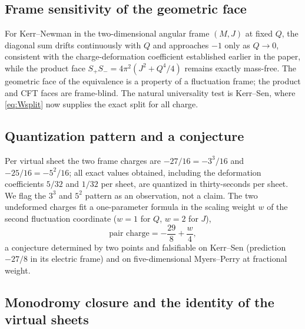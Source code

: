 \subsection{Frame sensitivity of the geometric face}

For Kerr--Newman in the two-dimensional angular frame $(M,J)$ at fixed $Q$, the diagonal sum drifts continuously with $Q$ and approaches $-1$ only as $Q \to 0$, consistent with the charge-deformation coefficient established earlier in the paper, while the product face $S_+S_- = 4\pi^2(J^2 + Q^4/4)$ remains exactly mass-free. The geometric face of the equivalence is a property of a fluctuation frame; the product and CFT faces are frame-blind. The natural universality test is Kerr--Sen, where \eqref{eq:Wsplit} now supplies the exact split for all charge.

\subsection{Quantization pattern and a conjecture}

Per virtual sheet the two frame charges are $-27/16 = -3^3/16$ and $-25/16 = -5^2/16$; all exact values obtained, including the deformation coefficients $5/32$ and $1/32$ per sheet, are quantized in thirty-seconds per sheet. We flag the $3^3$ and $5^2$ pattern as an observation, not a claim. The two undeformed charges fit a one-parameter formula in the scaling weight $w$ of the second fluctuation coordinate ($w=1$ for $Q$, $w=2$ for $J$),
\begin{equation}
\text{pair charge} = -\frac{29}{8} + \frac{w}{4},
\label{eq:weight-conjecture}
\end{equation}
a conjecture determined by two points and falsifiable on Kerr--Sen (prediction $-27/8$ in its electric frame) and on five-dimensional Myers--Perry at fractional weight.

\subsection{Monodromy closure and the identity of the virtual sheets}
\label{ssec:monodromy}


